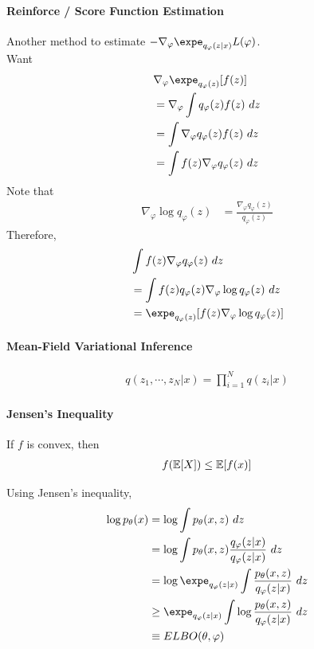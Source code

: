 \documentclass{article}
\begin{document}
	\paragraph{Reinforce / Score Function Estimation} Another method to estimate $- \nabla_\varphi \expe_{q_\varphi(z|x)} L(\varphi)$.\\
	Want
	\begin{align}
		&\nabla_\varphi \expe_{q_\varphi(z)} [f(z)] \\
		&= \nabla_\varphi \int q_\varphi(z) f(z)\ dz \\
		&= \int \nabla_\varphi q_\varphi(z) f(z)\ dz \\
		&= \int f(z) \nabla_\varphi q_\varphi(z) \ dz
	\end{align}
	Note that
	\begin{align}
		\nabla_\varphi \log q_\varphi(z) &= \frac{\nabla_\varphi q_\varphi(z)}{q_\varphi(z)}
	\end{align}
	Therefore,
	\begin{align}
		&\int f(z) \nabla_\varphi q_\varphi(z) \ dz \\
		&= \int f(z) q_\varphi(z) \nabla_\varphi \log q_\varphi(z) \ dz \\
		&= \expe_{q_\varphi(z)}[ f(z) \nabla_\varphi \log q_\varphi(z)]
	\end{align}
	
	\paragraph{Mean-Field Variational Inference}
	\begin{align}
		q(z_1, \cdots, z_N|x) = \prod_{i=1}^N q(z_i|x)
	\end{align}

	\paragraph{Jensen's Inequality}
	\begin{theorem}
		If $f$ is convex, then
		\begin{align}
			f(\mathbb{E}[{X}]) \leq \mathbb{E}[{f(x)}]
		\end{align}
	\end{theorem}
	Using Jensen's inequality,
	\begin{align}
		\log p_\theta(x) &= \log \int p_\theta(x, z)\ dz \\
		&= \log \int p_\theta(x,z) \frac{q_\varphi(z|x)}{q_\varphi(z|x)}\ dz \\
		&= \log \expe_{q_\varphi(z|x)} \int \frac{p_\theta(x,z)}{q_\varphi(z|x)}\ dz \\
		&\geq \expe_{q_\varphi(z|x)} \int \log \frac{p_\theta(x,z)}{q_\varphi(z|x)}\ dz \\
		&\equiv ELBO(\theta, \varphi)
	\end{align}
\end{document}
